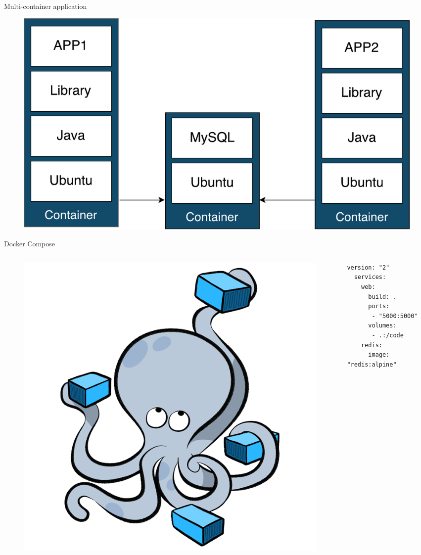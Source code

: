 \documentclass{beamer}
\begin{document}
  \begin{frame}{Multi-container application}
    \begin{figure}
      \includegraphics[width=1\textwidth]{img/docker_multicontainer.pdf}
    \end{figure}
  \end{frame}

  \begin{frame}[fragile]{Docker Compose}
    \begin{columns}[c]
      \begin{column}{.4\textwidth}
        \begin{figure}
          \includegraphics[width=1\textwidth]{img/docker_compose.png}
        \end{figure}
      \end{column}
      \begin{column}{.6\textwidth}
      \begin{lstlisting}[basicstyle=\ttfamily,keywordstyle=\color{red}]
  version: "2"
  services:
    web:
      build: .
      ports:
       - "5000:5000"
      volumes:
       - .:/code
    redis:
      image: "redis:alpine"
      \end{lstlisting}
      \end{column}
    \end{columns}
  \end{frame}
\end{document}
